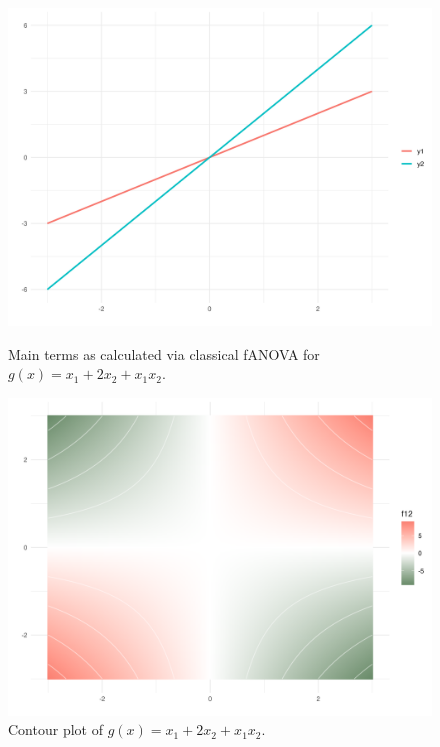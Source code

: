 \begin{figure}[htpb]
    \centering
    \begin{minipage}[t]{0.49\textwidth}
        \centering
        \includegraphics[width=\textwidth]{images/p_main_effect_ex1.png}
        \caption{Main terms as calculated via classical fANOVA for $g(x) = x_1 + 2 x_2 + x_1 x_2$.}
        \label{fig:main_effects_ex1}
    \end{minipage}%
    \hfill
    \begin{minipage}[t]{0.49\textwidth}
        \centering
        \includegraphics[width=\textwidth]{images/p_contour_ex1.png}
        \caption{Contour plot of $g(x) = x_1 + 2 x_2 + x_1 x_2$.}
        \label{fig:contour_ex1}
    \end{minipage}
\end{figure}

